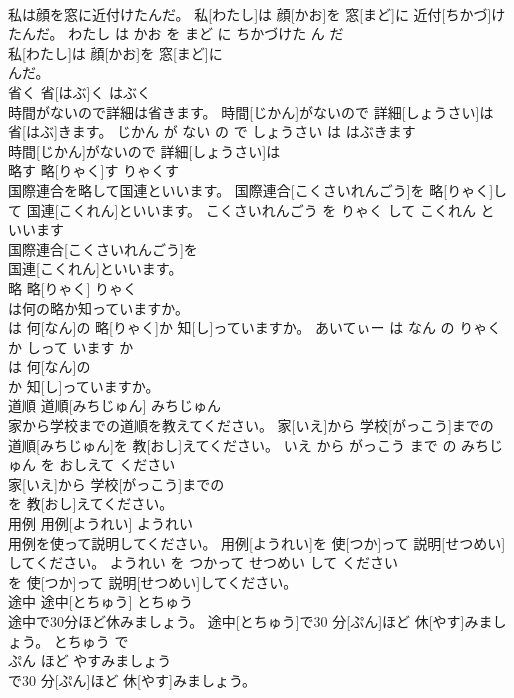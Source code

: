 \documentclass[8pt]{extreport}
\begin{document}
\begin{CJK}{UTF8}{min}
\\	私は顔を窓に近付けたんだ。	私[わたし]は 顔[かお]を 窓[まど]に 近付[ちかづ]けたんだ。	わたし は かお を まど に ちかづけた ん だ	
\\	私[わたし]は 顔[かお]を 窓[まど]に
\\	んだ。			
\\	省く	省[はぶ]く	はぶく	
\\	時間がないので詳細は省きます。	時間[じかん]がないので 詳細[しょうさい]は 省[はぶ]きます。	じかん が ない の で しょうさい は はぶきます	
\\	時間[じかん]がないので 詳細[しょうさい]は
\\	略す	略[りゃく]す	りゃくす	
\\	国際連合を略して国連といいます。	国際連合[こくさいれんごう]を 略[りゃく]して 国連[こくれん]といいます。	こくさいれんごう を りゃく して こくれん と いいます	
\\	国際連合[こくさいれんごう]を
\\	国連[こくれん]といいます。			
\\	略	略[りゃく]	りゃく	
\\	は何の略か知っていますか。	
\\	[あいてぃー]は 何[なん]の 略[りゃく]か 知[し]っていますか。	あいてぃー は なん の りゃく か しって います か	
\\	[あいてぃー]は 何[なん]の
\\	か 知[し]っていますか。			
\\	道順	道順[みちじゅん]	みちじゅん	
\\	家から学校までの道順を教えてください。	家[いえ]から 学校[がっこう]までの 道順[みちじゅん]を 教[おし]えてください。	いえ から がっこう まで の みちじゅん を おしえて ください	
\\	家[いえ]から 学校[がっこう]までの
\\	を 教[おし]えてください。			
\\	用例	用例[ようれい]	ようれい	
\\	用例を使って説明してください。	用例[ようれい]を 使[つか]って 説明[せつめい]してください。	ようれい を つかって せつめい して ください	
\\	を 使[つか]って 説明[せつめい]してください。			
\\	途中	途中[とちゅう]	とちゅう	
\\	途中で30分ほど休みましょう。	途中[とちゅう]で30 分[ぷん]ほど 休[やす]みましょう。	とちゅう で 
\\	ぷん ほど やすみましょう	
\\	で30 分[ぷん]ほど 休[やす]みましょう。			

\end{CJK}
\end{document}
